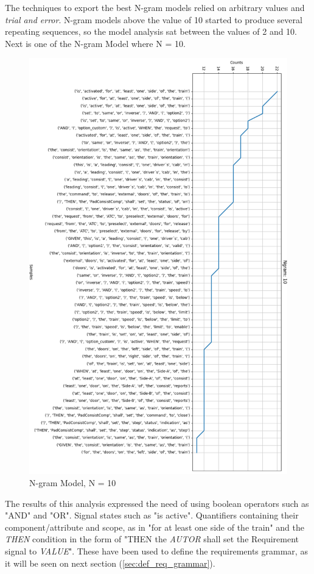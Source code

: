 The techniques to export the best N-gram models relied on arbitrary values and \textit{trial and error}. N-gram models above the value of 10 started to produce several repeating sequences, so the model analysis sat between the values of 2 and 10. Next is one of the N-gram Model where N = 10.

\begin{figure}[H]
    \centering
    \includegraphics[scale=0.6]{images/n_gram10_cut.png}
    \caption{N-gram Model, N = 10}
    \label{fig:n_gram_model_10}
\end{figure}

The results of this analysis expressed the need of using boolean operators such as "AND" and "OR". Signal states such as "is active". Quantifiers containing their component/attribute and scope, as in "for at least one side of the train" and the \textit{THEN} condition in the form of "THEN the \textit{AUTOR} shall set the Requirement signal to \textit{VALUE}".
These have been used to define the requirements grammar, as it will be seen on next section (\ref{sec:def_req_grammar}).


